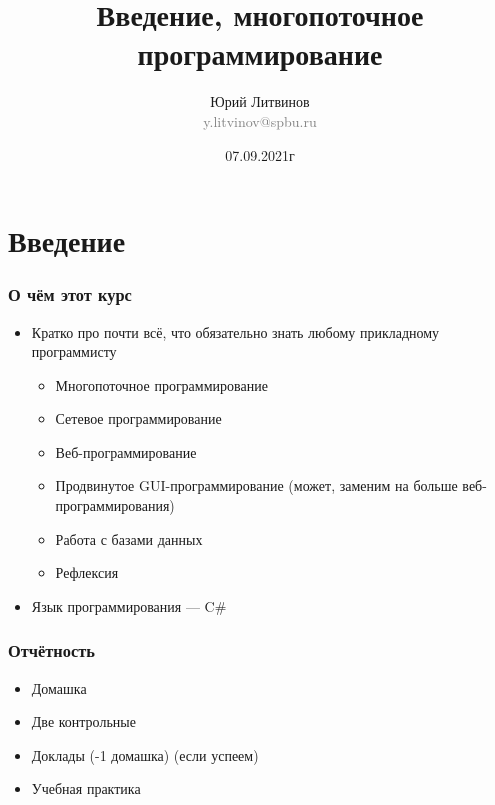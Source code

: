 \documentclass[xetex,mathserif,serif]{beamer}
\title{Введение, многопоточное программирование}
\author[Юрий Литвинов]{Юрий Литвинов\\\small{\textcolor{gray}{y.litvinov@spbu.ru}}}
\date{07.09.2021г}
\begin{document}
    \frame{\titlepage}

    \section{Введение}

    \begin{frame}
        \frametitle{О чём этот курс}
        \begin{itemize}
            \item Кратко про почти всё, что обязательно знать любому прикладному программисту
            \begin{itemize}
                \item Многопоточное программирование
                \item Сетевое программирование
                \item Веб-программирование
                \item Продвинутое GUI-программирование (может, заменим на больше веб-программирования)
                \item Работа с базами данных
                \item Рефлексия
            \end{itemize}
            \item Язык программирования --- C\#
        \end{itemize}
    \end{frame}

    \begin{frame}
        \frametitle{Отчётность}
        \begin{itemize}
            \item Домашка
            \item Две контрольные
            \item Доклады (-1 домашка) (если успеем)
            \item Учебная практика
        \end{itemize}
    \end{frame}
\end{document}
